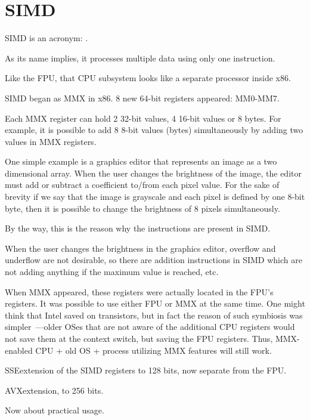 \chapter{SIMD}

\label{SIMD_x86}
\ac{SIMD} is an acronym: .

As its name implies, it processes multiple data using only one instruction.

Like the \ac{FPU}, that \ac{CPU} subsystem looks like a separate processor inside x86.


SIMD began as MMX in x86. 8 new 64-bit registers appeared: MM0-MM7.

Each MMX register can hold 2 32-bit values, 4 16-bit values or 8 bytes.
For example, it is possible to add 8 8-bit values (bytes) simultaneously by adding two values in MMX registers.

One simple example is a graphics editor that represents an image as a two dimensional array.
When the user changes the brightness of the image, the editor must add or subtract a coefficient to/from each pixel value.
For the sake of brevity if we say that the image is grayscale and each pixel is defined by one 8-bit byte, then it is possible
to change the brightness of 8 pixels simultaneously.

By the way, this is the reason why the  instructions are present in SIMD.

When the user changes the brightness in the graphics editor, overflow and underflow are not desirable, 
so there are addition instructions in SIMD which are not adding anything if the maximum value is reached, etc.

When MMX appeared, these registers were actually located in the FPU's registers. 
It was possible to use either FPU or MMX at the same time. One might think that Intel saved on transistors,
but in fact the reason of such symbiosis was simpler~---older \ac{OS}es that are not aware 
of the additional CPU registers would not save them at the context switch, 
but saving the FPU registers.
Thus, MMX-enabled CPU + old \ac{OS} + process utilizing MMX features will still work.

SSE\EMDASHis extension of the SIMD registers to 128 bits, now separate from the FPU.

AVX\EMDASHanother extension, to 256 bits.

Now about practical usage.

